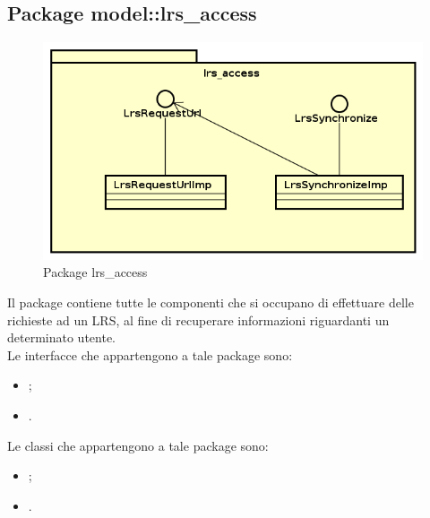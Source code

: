 \documentclass[../Tesi.tex]{subfiles}
\begin{document}
	\subsection{Package model::lrs\_access}
		\begin{figure}[H]
			\centering
			\includegraphics[scale=0.6]{images/package_diagrams/lrs_access}
				\caption{Package lrs\_access}
		\end{figure}
		Il package  contiene tutte le componenti che si occupano di effettuare delle richieste ad un LRS, al fine di recuperare informazioni riguardanti un determinato utente. \\
		Le interfacce che appartengono a tale package sono:
		\begin{itemize}
			\item {};
			\item {}.
		\end{itemize}
		Le classi che appartengono a tale package sono:
		\begin{itemize}
			\item {};
			\item {}.
		\end{itemize}
\end{document}

